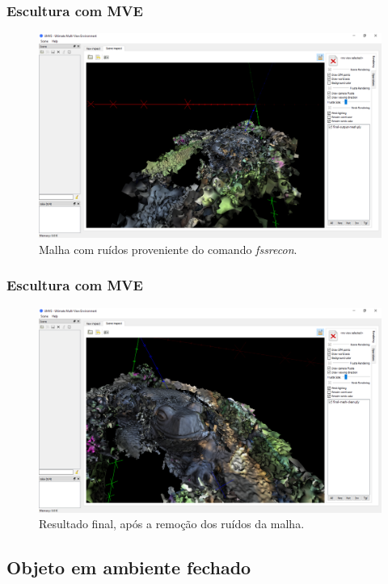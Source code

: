 \documentclass[table, usenames, svgnames, xcolor=dvipsnames]{beamer}
\begin{document}
\begin{frame}
\frametitle{\textbf{Escultura com MVE}}
	\begin{figure}[!h]
		\centering
		\includegraphics[width=0.8\linewidth]{figs/mvemeshout.png}
		\caption{%
		Malha com ruídos proveniente do comando \emph{fssrecon}.
		}\label{fig:MVEFSSRMesh}
	\end{figure} 
\end{frame}

\begin{frame}
\frametitle{\textbf{Escultura com MVE}}
	\begin{figure}[!h]
		\centering
		\includegraphics[width=0.8\linewidth]{figs/mvemeshclean.png}
		\caption{%
		Resultado final, após a remoção dos ruídos da malha.
		}\label{fig:MVEMeshClean}
	\end{figure} 
\end{frame}

\subsection{Objeto em ambiente fechado}

\begin{frame}
	\begin{center}
	\end{center}
\end{frame}
\end{document}

